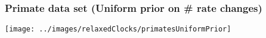 \begin{frame}
\frametitle{Primate data set (Uniform prior on \# rate changes)}

\begin{centering}

\texttt{[image: ../images/relaxedClocks/primatesUniformPrior]}

\end{centering}

\end{frame}